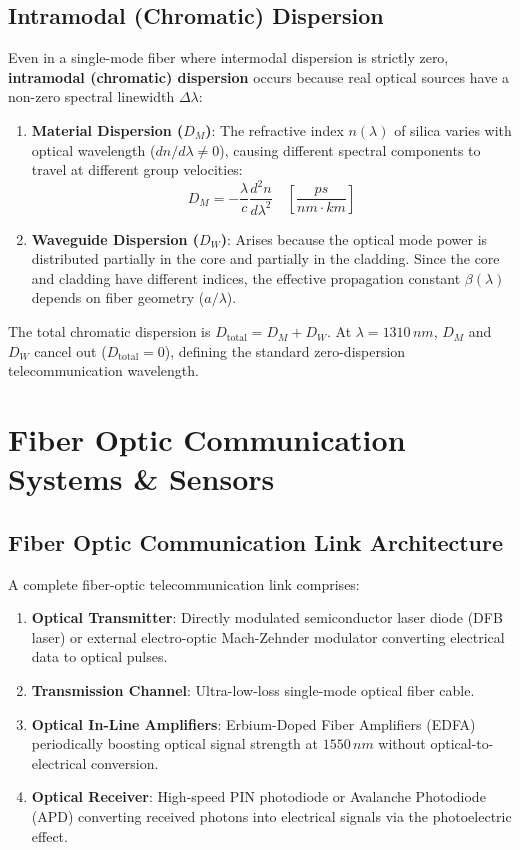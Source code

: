 \subsection{Intramodal (Chromatic) Dispersion}
Even in a single-mode fiber where intermodal dispersion is strictly zero, \textbf{intramodal (chromatic) dispersion} occurs because real optical sources have a non-zero spectral linewidth $\Delta \lambda$:
\begin{enumerate}
    \item \textbf{Material Dispersion ($D_M$)}: The refractive index $n(\lambda)$ of silica varies with optical wavelength ($dn/d\lambda \neq 0$), causing different spectral components to travel at different group velocities:
    \begin{equation}
        D_M = -\frac{\lambda}{c} \frac{d^2 n}{d\lambda^2} \quad \left[\si{\frac{ps}{nm\cdot km}}\right]
    \end{equation}
    \item \textbf{Waveguide Dispersion ($D_W$)}: Arises because the optical mode power is distributed partially in the core and partially in the cladding. Since the core and cladding have different indices, the effective propagation constant $\beta(\lambda)$ depends on fiber geometry ($a/\lambda$).
\end{enumerate}
The total chromatic dispersion is $D_{\text{total}} = D_M + D_W$. At $\lambda = 1310\,\si{nm}$, $D_M$ and $D_W$ cancel out ($D_{\text{total}} = 0$), defining the standard zero-dispersion telecommunication wavelength.

\section{Fiber Optic Communication Systems \& Sensors}

\subsection{Fiber Optic Communication Link Architecture}
A complete fiber-optic telecommunication link comprises:
\begin{enumerate}
    \item \textbf{Optical Transmitter}: Directly modulated semiconductor laser diode (DFB laser) or external electro-optic Mach-Zehnder modulator converting electrical data to optical pulses.
    \item \textbf{Transmission Channel}: Ultra-low-loss single-mode optical fiber cable.
    \item \textbf{Optical In-Line Amplifiers}: Erbium-Doped Fiber Amplifiers (EDFA) periodically boosting optical signal strength at $1550\,\si{nm}$ without optical-to-electrical conversion.
    \item \textbf{Optical Receiver}: High-speed PIN photodiode or Avalanche Photodiode (APD) converting received photons into electrical signals via the photoelectric effect.
\end{enumerate}

